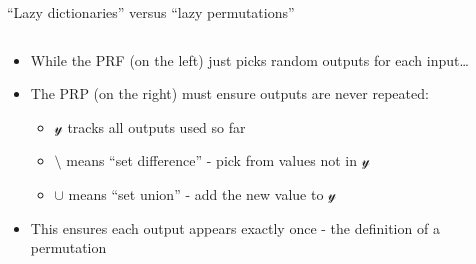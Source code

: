 \documentclass[aspectratio=169, lualatex, handout]{beamer}
\begin{document}
\begin{frame}{``Lazy dictionaries'' versus ``lazy permutations''}
	\begin{columns}[c]
		\begin{column}{0.5\textwidth}
			\begin{itemize}[<+->]
				\item While the PRF (on the left) just picks random outputs for each input\ldots
				\item The PRP (on the right) must ensure outputs are never repeated:
				      \begin{itemize}[<+->]
					      \item $\mathcal{y}$ tracks all outputs used so far
					      \item $\setminus$ means ``set difference'' - pick from values not in $\mathcal{y}$
					      \item $\cup$ means ``set union'' - add the new value to $\mathcal{y}$
				      \end{itemize}
				\item This ensures each output appears exactly once - the definition of a permutation
			\end{itemize}
		\end{column}
		\begin{column}{0.5\textwidth}
			\begin{center}
			\end{center}
		\end{column}
	\end{columns}
\end{frame}
\end{document}
